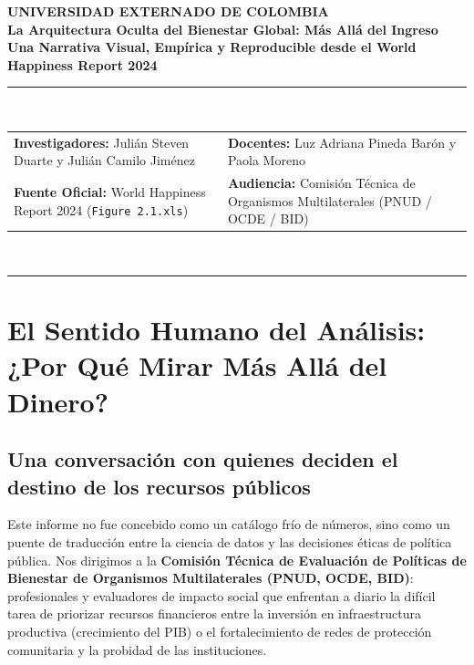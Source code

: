 \documentclass[9.5pt, a4paper]{article}
\begin{document}
\begin{center}
    {\scriptsize\textbf{\color{secondary}UNIVERSIDAD EXTERNADO DE COLOMBIA}}\\[0.05cm]
    {\Large\textbf{\color{primary}La Arquitectura Oculta del Bienestar Global: Más Allá del Ingreso}}\\[0.04cm]
    {\large\textbf{Una Narrativa Visual, Empírica y Reproducible desde el World Happiness Report 2024}}\\[0.08cm]
    \rule{\linewidth}{0.7pt}\\[0.04cm]
    \footnotesize
    \begin{tabularx}{\linewidth}{@{}X X@{}}
        \textbf{Investigadores:} Julián Steven Duarte y Julián Camilo Jiménez & \textbf{Docentes:} Luz Adriana Pineda Barón y Paola Moreno \\
        \textbf{Fuente Oficial:} World Happiness Report 2024 (\texttt{Figure 2.1.xls}) & \textbf{Audiencia:} Comisión Técnica de Organismos Multilaterales (PNUD / OCDE / BID)
    \end{tabularx}\\[0.02cm]
    \rule{\linewidth}{0.7pt}
\end{center}

\vspace{-0.2cm}

\section{El Sentido Humano del Análisis: ¿Por Qué Mirar Más Allá del Dinero?}

\subsection{Una conversación con quienes deciden el destino de los recursos públicos}
Este informe no fue concebido como un catálogo frío de números, sino como un puente de traducción entre la ciencia de datos y las decisiones éticas de política pública. Nos dirigimos a la \textbf{Comisión Técnica de Evaluación de Políticas de Bienestar de Organismos Multilaterales (PNUD, OCDE, BID)}: profesionales y evaluadores de impacto social que enfrentan a diario la difícil tarea de priorizar recursos financieros entre la inversión en infraestructura productiva (crecimiento del PIB) o el fortalecimiento de redes de protección comunitaria y la probidad de las instituciones.
\end{document}
